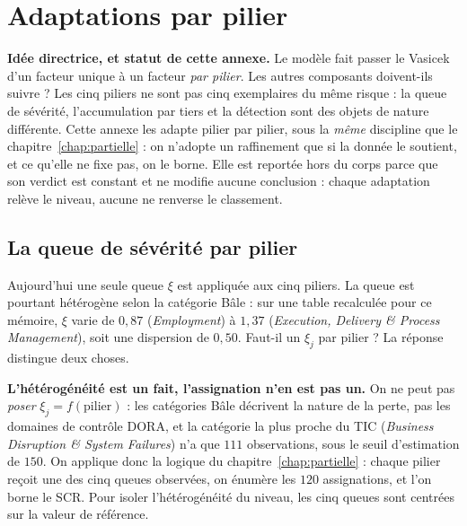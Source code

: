 \chapter{Adaptations par pilier}
\label{chap:adaptations}

\begin{cle}
\textbf{Idée directrice, et statut de cette annexe.} Le modèle fait passer le Vasicek d'un
facteur unique à un facteur \emph{par pilier}. Les autres composants doivent-ils suivre ? Les
cinq piliers ne sont pas cinq exemplaires du même risque : la queue de sévérité,
l'accumulation par tiers et la détection sont des objets de nature différente. Cette annexe
les adapte pilier par pilier, sous la \emph{même} discipline que le
chapitre~\ref{chap:partielle} : on n'adopte un raffinement que si la donnée le soutient, et
ce qu'elle ne fixe pas, on le borne. Elle est reportée hors du corps parce que son
verdict est constant et ne modifie aucune conclusion : chaque adaptation relève le
niveau, aucune ne renverse le classement.
\end{cle}

\section{La queue de sévérité par pilier}
\label{sec:xi-pilier}

Aujourd'hui une seule queue $\xi$ est appliquée aux cinq piliers. La queue est pourtant
hétérogène selon la catégorie Bâle : sur une table recalculée pour ce mémoire, $\xi$ varie de
$0{,}87$ (\emph{Employment}) à $1{,}37$ (\emph{Execution, Delivery \& Process Management}), soit
une dispersion de $0{,}50$.
Faut-il un $\xi_j$ par pilier ? La réponse distingue deux choses.

\begin{attention}
\textbf{L'hétérogénéité est un fait, l'assignation n'en est pas un.} On ne peut pas
\emph{poser} $\xi_j = f(\text{pilier})$ : les catégories Bâle décrivent la nature de la
perte, pas les domaines de contrôle DORA, et la catégorie la plus proche du TIC
(\emph{Business Disruption \& System Failures}) n'a que $111$ observations, sous le seuil
d'estimation de $150$. On applique donc la logique du chapitre~\ref{chap:partielle} : chaque pilier
reçoit une des cinq queues observées, on énumère les $120$ assignations, et l'on borne le
SCR. Pour isoler l'hétérogénéité du niveau, les cinq queues sont centrées sur la valeur de
référence.
\end{attention}

